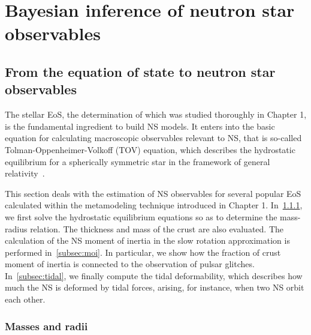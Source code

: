 %

\chapter{Bayesian inference of neutron star observables}


\section{From the equation of state to neutron star observables}

The stellar EoS, the determination of which was studied thoroughly in Chapter 
1, is the fundamental ingredient to build NS models. It enters into the 
basic equation for calculating macroscopic observables relevant to NS, that is 
so-called Tolman-Oppenheimer-Volkoff (TOV) equation, which describes the 
hydrostatic equilibrium for a spherically symmetric star in the framework of 
general relativity~\cite{Tolman1939,Oppenheimer1939}.

This section deals with the estimation of NS observables for several 
popular EoS calculated within the metamodeling technique introduced in 
Chapter 1. In~\ref{subsec:masses}, we first solve the hydrostatic 
equilibrium equations so as to determine the mass-radius relation. The 
thickness and mass of the crust are also evaluated. The calculation of the NS 
moment of inertia in the slow rotation approximation is performed 
in~\ref{subsec:moi}. In particular, we show how the fraction of crust moment 
of inertia is connected to the 
observation of pulsar glitches. In~\ref{subsec:tidal}, we finally compute the 
tidal deformability, which describes how much the NS is deformed by tidal 
forces, arising, for instance, when two NS orbit each other.

\subsection{Masses and radii}\label{subsec:masses}

